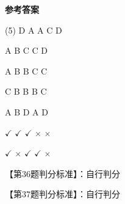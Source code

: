 \documentclass[11pt, a4paper]{article}
\begin{document}
\begin{center}
    \Huge \textbf{参考答案}
\end{center}

    \begin{tasks}[label=\arabic*. , label-width=14pt](5)
        \task D
        \task A
        \task A
        \task C
        \task D

        \task A
        \task B
        \task C
        \task C
        \task D

        \task A
        \task B
        \task B
        \task C
        \task C

        \task C
        \task B
        \task B
        \task B
        \task C

        \task A
        \task B
        \task D
        \task A
        \task D

        \task $\checkmark$
        \task $\checkmark$
        \task $\checkmark$
        \task $\times$
        \task $\times$

        \task $\checkmark$
        \task $\times$
        \task $\checkmark$
        \task $\checkmark$
        \task $\times$
    \end{tasks}

    【第36题判分标准】：自行判分

    【第37题判分标准】：自行判分
\end{document}
